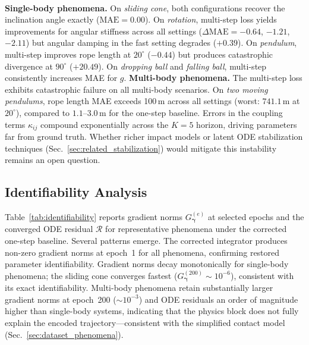 \documentclass[runningheads]{llncs}
\begin{document}
\\
\noindent
\textbf{Single-body phenomena.} On \emph{sliding cone}, both configurations recover the inclination angle exactly ($\mathrm{MAE} = 0.00$). On \emph{rotation}, multi-step loss yields improvements for angular stiffness across all settings ($\Delta\mathrm{MAE} = -0.64$, $-1.21$, $-2.11$) but angular damping in the fast setting degrades ($+0.39$). On \emph{pendulum}, multi-step improves rope length at $20^\circ$ ($-0.44$) but produces catastrophic divergence at $90^\circ$ ($+20.49$). On \emph{dropping ball} and \emph{falling ball}, multi-step consistently increases MAE for $g$.
\textbf{Multi-body phenomena.} The multi-step loss exhibits catastrophic failure on all multi-body scenarios. On \emph{two moving pendulums}, rope length MAE exceeds 100\,m across all settings (worst: $741.1$\,m at $20^\circ$), compared to $1.1$--$3.0$\,m for the one-step baseline. Errors in the coupling terms $\kappa_{ij}$ compound exponentially across the $K{=}5$ horizon, driving parameters far from ground truth. Whether richer impact models or latent ODE stabilization techniques (Sec.~\ref{sec:related_stabilization}) would mitigate this instability remains an open question.







\subsection{Identifiability Analysis}
\label{sec:exp_identifiability}

Table~\ref{tab:identifiability} reports gradient norms $G_{\boldsymbol{\gamma}}^{(e)}$ at selected epochs and the converged ODE residual $\mathcal{R}$ for representative phenomena under the corrected one-step baseline. Several patterns emerge. The corrected integrator produces non-zero gradient norms at epoch~1 for all phenomena, confirming restored parameter identifiability. Gradient norms decay monotonically for single-body phenomena; the sliding cone converges fastest ($G_{\boldsymbol{\gamma}}^{(200)} \sim 10^{-6}$), consistent with its exact identifiability. Multi-body phenomena retain substantially larger gradient norms at epoch~200 ($\sim 10^{-3}$) and ODE residuals an order of magnitude higher than single-body systems, indicating that the physics block does not fully explain the encoded trajectory---consistent with the simplified contact model (Sec.~\ref{sec:dataset_phenomena}).
\end{document}
